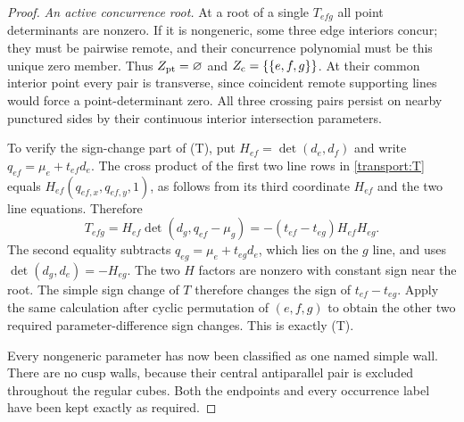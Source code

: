 \begin{proof}
\emph{An active concurrence root.}
At a root of a single $T_{efg}$ all point determinants are nonzero. If it is
nongeneric, some three edge interiors concur; they must be pairwise remote,
and their concurrence polynomial must be this unique zero member. Thus
$Z_{\rm pt}=\varnothing$ and $Z_{\rm c}=\{\{e,f,g\}\}$. At their common
interior point every pair is transverse, since coincident remote supporting
lines would force a point-determinant zero. All three crossing pairs persist
on nearby punctured sides by their continuous interior intersection parameters.

To verify the sign-change part of (T), put $H_{ef}=\det(d_e,d_f)$ and write
$q_{ef}=\mu_e+t_{ef}d_e$. The cross product of the first two line rows in
\eqref{transport:T} equals $H_{ef}(q_{ef,x},q_{ef,y},1)$, as follows from
its third coordinate $H_{ef}$ and the two line equations. Therefore
\begin{equation}\label{transport:T-order}
 T_{efg}=H_{ef}\det(d_g,q_{ef}-\mu_g)
        =-(t_{ef}-t_{eg})H_{ef}H_{eg}.
\end{equation}
The second equality subtracts $q_{eg}=\mu_e+t_{eg}d_e$, which lies on
the $g$ line, and uses $\det(d_g,d_e)=-H_{eg}$. The two $H$ factors are
nonzero with constant sign near the root. The simple sign change of $T$
therefore changes the sign of $t_{ef}-t_{eg}$. Apply the same calculation
after cyclic permutation of $(e,f,g)$ to obtain the other two required
parameter-difference sign changes. This is exactly (T).

Every nongeneric parameter has now been classified as one named simple wall.
There are no cusp walls, because their central antiparallel pair is excluded
throughout the regular cubes. Both the endpoints and every occurrence label
have been kept exactly as required.
\end{proof}

